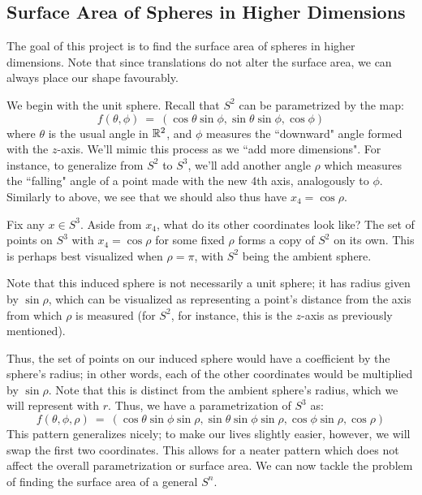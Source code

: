 \subsection{Surface Area of Spheres in Higher Dimensions}
The goal of this project is to find the surface area of spheres in
higher dimensions. Note that since translations do not alter the surface area,
we can always place our shape favourably.

We begin with the unit sphere. Recall that $ S^{2} $ can be parametrized by the
map:
\begin{equation*}
    f(\theta, \phi) \ = \ (\cos\theta\sin\phi, \sin\theta\sin\phi, \cos\phi)
\end{equation*}
where $ \theta $ is the usual angle in $ \mathbb{R}^{2} $, and $ \phi $ measures the
``downward" angle formed with the $ z $-axis. We'll mimic this process as we
``add more dimensions". For instance, to generalize from $ S^{2} $ to $ S^{3} $,
we'll add another angle $ \rho $ which measures the ``falling" angle of a point
made with the new 4th axis, analogously to $ \phi $. Similarly to above, we see
that we should also thus have $ x_{4} = \cos\rho $.

Fix any $ x \in S^{3} $. Aside from $ x_{4} $, what do its other coordinates look
like? The set of points on $ S^{3} $ with $ x_{4} = \cos\rho $ for some fixed
$ \rho $ forms a copy of $ S^{2} $ on its own. This is perhaps best visualized
when $ \rho = \pi $, with $ S^{2} $ being the ambient sphere.

Note that this induced sphere is not necessarily a unit sphere; it has radius
given by $ \sin\rho $, which can be visualized as representing a point's distance
from the axis from which $ \rho $ is measured (for $ S^{2} $, for instance, this
is the $ z $-axis as previously mentioned).

Thus, the set of points on our induced sphere would have a coefficient by the
sphere's radius; in other words, each of the other coordinates would be
multiplied by $ \sin\rho $. Note that this is distinct from the ambient sphere's
radius, which we will represent with $ r $. Thus, we have a parametrization of
$ S^{3} $ as:
\begin{equation*}
    f(\theta,\phi,\rho) \ = \
    (\cos\theta\sin\phi\sin\rho,\sin\theta\sin\phi\sin\rho,
    \cos\phi\sin\rho,\cos\rho)
\end{equation*}
This pattern generalizes nicely; to make our lives slightly easier, however, we
will swap the first two coordinates. This allows for a neater pattern which does
not affect the overall parametrization or surface area. We can now tackle the
problem of finding the surface area of a general $ S^{n} $.

